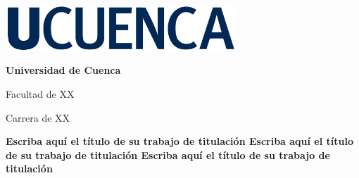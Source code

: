 
\maketitle

\newpage

\hphantom{Hola!}%

\vspace{-0.05\baselineskip}

\begin{center}
    \centering\includegraphics[width=8.7cm,height=1.69cm]{Imagenes/logo-UCuenca-GRANDE-JPG.jpg}
\end{center}

\vspace{.7\baselineskip} %

\begin{center} %
    \begin{espaciodoble}
        {\fontsize{18}{18}\selectfont \textbf{Universidad de Cuenca}} %
        
        {\fontsize{14}{14}\selectfont Facultad de XX} %
        
        {\fontsize{14}{14}\selectfont Carrera de XX} %
    \end{espaciodoble}
    
    \vspace{.5\baselineskip}%
    
    \begin{espaciosimple}
        {\fontsize{12}{14}\selectfont \textbf{Escriba aquí el título de su trabajo de titulación Escriba aquí el título de su trabajo de titulación Escriba aquí el título de su trabajo de titulación }} %
        
    \end{espaciosimple} 
\end{center}

